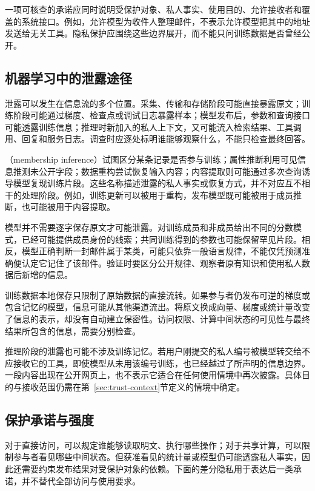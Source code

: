 一项可核查的承诺应同时说明受保护对象、私人事实、使用目的、允许接收者和覆盖的系统接口。例如，允许模型为收件人整理邮件，不表示允许模型把其中的地址发送给无关工具。隐私保护应围绕这些边界展开，而不能只问训练数据是否曾经公开。

\subsection{机器学习中的泄露途径}
\label{sec:privacy-leakage-channels}

泄露可以发生在信息流的多个位置。采集、传输和存储阶段可能直接暴露原文；训练阶段可能通过梯度、检查点或调试日志暴露样本；模型发布后，参数和查询接口可能透露训练信息；推理时新加入的私人上下文，又可能流入检索结果、工具调用、回复和服务日志。调查时应逐处标明谁能够观察什么，不能只检查最终回答。

（membership inference）试图区分某条记录是否参与训练；属性推断利用可见信息推测未公开字段；数据重构尝试恢复输入内容；内容提取则可能通过多次查询诱导模型复现训练片段。这些名称描述泄露的私人事实或恢复方式，并不对应互不相干的处理阶段。例如，训练更新可以被用于重构，发布模型既可能被用于成员推断，也可能被用于内容提取。

模型并不需要逐字保存原文才可能泄露。对训练成员和非成员给出不同的分数模式，已经可能提供成员身份的线索；共同训练得到的参数也可能保留罕见片段。相反，模型正确判断一封邮件属于某类，可能只依靠一般语言规律，不能仅凭预测准确便认定它记住了该邮件。验证时要区分公开规律、观察者原有知识和使用私人数据后新增的信息。

训练数据本地保存只限制了原始数据的直接流转。如果参与者仍发布可逆的梯度或包含记忆的模型，信息可能从其他渠道流出。将原文换成向量、梯度或统计量改变了信息的表示，却没有自动建立保密性。访问权限、计算中间状态的可见性与最终结果所包含的信息，需要分别检查。

推理阶段的泄露也可能不涉及训练记忆。若用户刚提交的私人编号被模型转交给不应接收它的工具，即使模型从未用该编号训练，也已经越过了所声明的信息边界。一段内容出现在公开网页上，也不表示它适合在任何使用情境中再次披露。具体目的与接收范围仍需在第~\ref{sec:trust-context}节定义的情境中确定。

\subsection{保护承诺与强度}
\label{sec:privacy-guarantees}

对于直接访问，可以规定谁能够读取明文、执行哪些操作；对于共享计算，可以限制参与者看见哪些中间状态。但获准看见的统计量或模型仍可能透露私人事实，因此还需要约束发布结果对受保护对象的依赖。下面的差分隐私用于表达后一类承诺，并不替代全部访问与使用要求。

